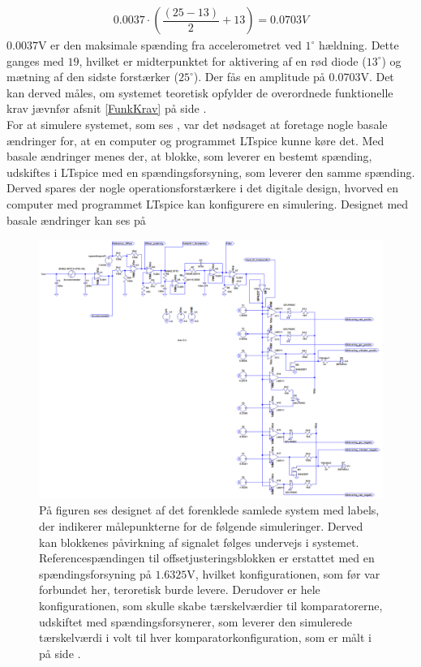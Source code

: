 \begin{eqnarray}
0.0037 \cdot (\dfrac{(25-13)}{2} + 13) = 0.0703V
\end{eqnarray}
\noindent $0.0037$V er den maksimale spænding fra accelerometret ved $1^{\circ}$ hældning. Dette ganges med $19$, hvilket er midterpunktet for aktivering af en rød diode ($13^{\circ}$) og mætning af den sidste forstærker ($25^{\circ}$). Der fås en amplitude på $0.0703$V. Det kan derved måles, om systemet teoretisk opfylder de overordnede funktionelle krav jævnfør afsnit \ref{FunkKrav} på side \pageref{FunkKrav}.\\
For at simulere systemet, som ses , var det nødsaget at foretage nogle basale ændringer for, at en computer og programmet LTspice kunne køre det. Med basale ændringer menes der, at blokke, som leverer en bestemt spænding, udskiftes i LTspice med en spændingsforsyning, som leverer den samme spænding. Derved spares der nogle operationsforstærkere i det digitale design, hvorved en computer med programmet LTspice kan konfigurere en simulering. Designet med basale ændringer kan ses på 
\begin{figure}[H]
	\centering
	\includegraphics[scale=.38]{figures/cProblemloesning/Samlet_system2_sim.PNG}
	\caption{På figuren ses designet af det forenklede samlede system med labels, der indikerer målepunkterne for de følgende simuleringer. Derved kan blokkenes påvirkning af signalet følges undervejs i systemet. Referencespændingen til offsetjusteringsblokken er erstattet med en spændingsforsyning på $1.6325$V, hvilket konfigurationen, som før var forbundet her, teroretisk burde levere. Derudover er hele konfigurationen, som skulle skabe tærskelværdier til komparatorerne, udskiftet med spændingsforsynerer, som leverer den simulerede tærskelværdi i volt til hver komparatorkonfiguration, som er målt i  på side \pageref{Tab:test_reference1}.}
	\label{fig:samlet_system}
\end{figure}
